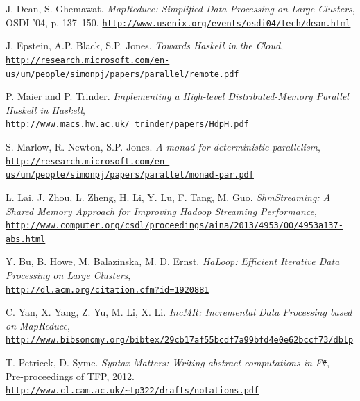 \documentclass[9pt,a4paper]{article}
\newcommand{\fsharp}{F\texttt \#}
\newcommand{\samehref}[1]{\href{#1}{\texttt{#1}}}
\begin{document}
\begin{thebibliography}{9}

     J. Dean, S. Ghemawat. 
        \emph{MapReduce: Simplified Data Processing on Large Clusters}, \\
        OSDI '04, p. 137--150.
        \samehref{http://www.usenix.org/events/osdi04/tech/dean.html}

     J. Epstein, A.P. Black, S.P. Jones.
        \emph{Towards Haskell in the Cloud},\\
        \samehref{http://research.microsoft.com/en-us/um/people/simonpj/papers/parallel/remote.pdf}
        
     P. Maier and P. Trinder.
        \emph{Implementing a High-level Distributed-Memory Parallel Haskell in Haskell},\\
        \samehref{http://www.macs.hw.ac.uk/~trinder/papers/HdpH.pdf}
        
     S. Marlow, R. Newton, S.P. Jones.
        \emph{A monad for deterministic parallelism},\\
        \samehref{http://research.microsoft.com/en-us/um/people/simonpj/papers/parallel/monad-par.pdf}
        
     L. Lai, J. Zhou, L. Zheng, H. Li, Y. Lu, F. Tang, M. Guo.
        \emph{ShmStreaming: A Shared Memory Approach for Improving Hadoop Streaming Performance},\\
        \samehref{http://www.computer.org/csdl/proceedings/aina/2013/4953/00/4953a137-abs.html}
            
     Y. Bu, B. Howe, M. Balazinska, M. D. Ernst.
        \emph{HaLoop: Efficient Iterative Data Processing on Large Clusters},\\
        \samehref{http://dl.acm.org/citation.cfm?id=1920881}
        
     C. Yan, X. Yang, Z. Yu, M. Li, X. Li.
        \emph{IncMR: Incremental Data Processing based on MapReduce},\\
        \samehref{http://www.bibsonomy.org/bibtex/29cb17af55bcdf7a99bfd4e0e62bccf73/dblp}
    
     T. Petricek, D. Syme.
        \emph{Syntax Matters: Writing abstract computations in \fsharp},\\
        Pre-proceedings of TFP, 2012.\\
        \href{http://www.cl.cam.ac.uk/~tp322/drafts/notations.pdf}
            {\texttt{http://www.cl.cam.ac.uk/{\textasciitilde}tp322/drafts/notations.pdf}}


\end{thebibliography}
\end{document}
